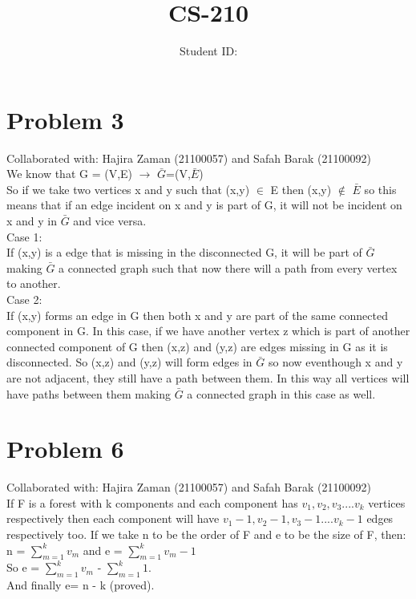 \documentclass{article}
\title{CS-210 \hwNo}
\author{\myname \qquad Student ID: \myid}
\begin{document}
\maketitle


\section{Problem 3}
Collaborated with: Hajira Zaman (21100057) and Safah Barak (21100092) \\
We know that G = (V,E) $\rightarrow$ $\bar{G}$=(V,$\bar{E}$)\\
So if we take two vertices x and y such that (x,y) $\in$ E then (x,y) $\notin$ $\bar{E}$ so this means that if an edge incident on x and y is part of G, it will not be incident on x and y in $\bar{G}$ and vice versa.\\ 
Case 1:\\
If (x,y) is a edge that is missing in the disconnected G, it will be part of $\bar{G}$ making $\bar{G}$ a connected graph such that now there will a path from every vertex to another.\\
Case 2:\\
If (x,y) forms an edge in G then both x and y are part of the same connected component in G. In this case, if we have another vertex z which is part of another connected component of G then (x,z) and (y,z) are edges missing in G as it is disconnected. So (x,z) and (y,z) will form edges in $\bar{G}$ so now eventhough x and y are not adjacent, they still have a path between them. In this way all vertices will have paths between them making $\bar{G}$ a connected graph in this case as well.\\

\section{Problem 6}
Collaborated with: Hajira Zaman (21100057) and Safah Barak (21100092)\\
If F is a forest with k components and each component has $v_{1},v_{2},v_{3}....v_{k}$ vertices respectively then each component will have  $v_{1}-1,v_{2}-1,v_{3}-1....v_{k}-1$ edges respectively too. If we take n to be the order of F and e to be the size of F, then:\\ n = $\sum_{m=1}^{k} v_{m}$ and e = $\sum_{m=1}^{k} v_{m}-1$ \\ So e = $\sum_{m=1}^{k} v_{m}$ - $\sum_{m=1}^{k} 1$. \\ And finally e= n - k (proved). 
\end{document}
